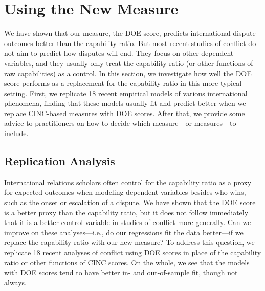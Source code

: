 
\section{Using the New Measure}
\label{sec:replications}

We have shown that our measure, the DOE score, predicts international dispute outcomes better than the capability ratio.
But most recent studies of conflict do not aim to predict how disputes will end.
They focus on other dependent variables, and they usually only treat the capability ratio (or other functions of raw capabilities) as a control.
In this section, we investigate how well the DOE score performs as a replacement for the capability ratio in this more typical setting.
First, we replicate 18 recent empirical models of various international phenomena, finding that these models usually fit and predict better when we replace CINC-based measures with DOE scores.
After that, we provide some advice to practitioners on how to decide which measure---or measures---to include.

\subsection{Replication Analysis}

International relations scholars often control for the capability ratio as a proxy for expected outcomes when modeling dependent variables besides who wins, such as the onset or escalation of a dispute.
We have shown that the DOE score is a better proxy than the capability ratio, but it does not follow immediately that it is a better control variable in studies of conflict more generally.
Can we improve on these analyses---i.e., do our regressions fit the data better---if we replace the capability ratio with our new measure?
To address this question, we replicate 18 recent analyses of conflict using DOE scores in place of the capability ratio or other functions of CINC scores.
On the whole, we see that the models with DOE scores tend to have better in- and out-of-sample fit, though not always.


